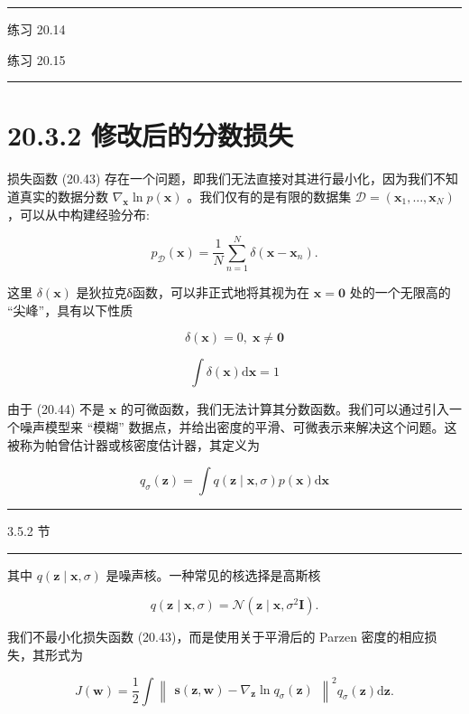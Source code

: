 \documentclass[10pt]{article}
\newcommand{\HRule}{\begin{center}\rule{0.9\linewidth}{0.2mm}\end{center}}
\begin{document}
\HRule

练习 20.14

练习 20.15

\HRule

\section*{20.3.2 修改后的分数损失}

损失函数 (20.43) 存在一个问题，即我们无法直接对其进行最小化，因为我们不知道真实的数据分数 \({\nabla }_{\mathbf{x}}\ln p\left( \mathbf{x}\right)\) 。我们仅有的是有限的数据集 \(\mathcal{D} = \left( {{\mathbf{x}}_{1},\ldots ,{\mathbf{x}}_{N}}\right)\) ，可以从中构建经验分布:

\[
{p}_{\mathcal{D}}\left( \mathbf{x}\right)  = \frac{1}{N}\mathop{\sum }\limits_{{n = 1}}^{N}\delta \left( {\mathbf{x} - {\mathbf{x}}_{n}}\right) . \tag{20.44}
\]

这里 \(\delta \left( \mathbf{x}\right)\) 是狄拉克δ函数，可以非正式地将其视为在 \(\mathbf{x} = \mathbf{0}\) 处的一个无限高的 “尖峰”，具有以下性质

\[
\delta \left( \mathbf{x}\right)  = 0,\;\mathbf{x} \neq  \mathbf{0} \tag{20.45}
\]

\[
\int \delta \left( \mathbf{x}\right) \mathrm{d}\mathbf{x} = 1 \tag{20.46}
\]

由于 (20.44) 不是 \(\mathbf{x}\) 的可微函数，我们无法计算其分数函数。我们可以通过引入一个噪声模型来 “模糊” 数据点，并给出密度的平滑、可微表示来解决这个问题。这被称为帕曾估计器或核密度估计器，其定义为

\[
{q}_{\sigma }\left( \mathbf{z}\right)  = \int q\left( {\mathbf{z} \mid  \mathbf{x},\sigma }\right) p\left( \mathbf{x}\right) \mathrm{d}\mathbf{x} \tag{20.47}
\]

\HRule

3.5.2 节

\HRule

其中 \(q\left( {\mathbf{z} \mid  \mathbf{x},\sigma }\right)\) 是噪声核。一种常见的核选择是高斯核

\[
q\left( {\mathbf{z} \mid  \mathbf{x},\sigma }\right)  = \mathcal{N}\left( {\mathbf{z} \mid  \mathbf{x},{\sigma }^{2}\mathbf{I}}\right) . \tag{20.48}
\]

我们不最小化损失函数 (20.43)，而是使用关于平滑后的 Parzen 密度的相应损失，其形式为

\[
J\left( \mathbf{w}\right)  = \frac{1}{2}\int {\begin{Vmatrix}\mathbf{s}\left( \mathbf{z},\mathbf{w}\right)  - {\nabla }_{\mathbf{z}}\ln {q}_{\sigma }\left( \mathbf{z}\right) \end{Vmatrix}}^{2}{q}_{\sigma }\left( \mathbf{z}\right) \mathrm{d}\mathbf{z}. \tag{20.49}
\]
\end{document}
